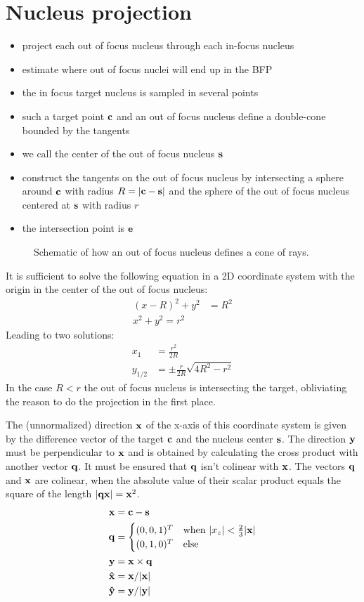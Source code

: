 \documentclass[twocolumn,DIV19]{scrartcl}
\begin{document}
\section{Nucleus projection}
\begin{itemize}
\item project each out of focus nucleus through each in-focus nucleus 
\item estimate where out of focus nuclei will end up in the BFP
\item the in focus target nucleus is sampled in several points
\item such a target point $\mathbf{c}$ and an out of focus nucleus define a
  double-cone bounded by the tangents
\item we call the center of the out of focus nucleus $\mathbf{s}$
\item construct the tangents on the out of focus nucleus by
  intersecting a sphere around $\mathbf{c}$ with radius $R=\mathopen| \mathbf{c}-\mathbf{s} \mathclose|$ and
  the sphere of the out of focus nucleus centered at $\mathbf{s}$ with radius
  $r$
\item the intersection point is $\mathbf{e}$
\end{itemize}

\begin{figure}[!hbt]
  \centering
  
  \caption{Schematic of how an out of focus nucleus defines a cone of
    rays.}
\end{figure}
It is sufficient to solve the following equation in a 2D coordinate
system with the origin in the center of the out of focus nucleus:
\begin{align}
  (x-R)^2+y^2&=R^2\\
  x^2+y^2=r^2
\end{align}
Leading to two solutions:
\begin{align}
  x_1&=\frac{r^2}{2R}\\
  y_{1/2}&=\pm\frac{r}{2R}\sqrt{4R^2-r^2}
\end{align}
In the case $R<r$ the out of focus nucleus is intersecting the target,
obliviating the reason to do the projection in the first place.

The (unnormalized) direction $\mathbf{x}$ of the x-axis of this coordinate
system is given by the difference vector of the target $\mathbf{c}$ and the
nucleus center $\mathbf{s}$. The direction $\mathbf{y}$ must be perpendicular to $\mathbf{x}$
and is obtained by calculating the cross product with another vector
$\mathbf{q}$.  It must be ensured that $\mathbf{q}$ isn't colinear with $\mathbf{x}$. The
vectors $\mathbf{q}$ and $\mathbf{x}$ are colinear, when the absolute value of their
scalar product equals the square of the length $\mathopen| \mathbf{q}\mathbf{x} \mathclose|=\mathbf{x}^2$.
\begin{align}
  \mathbf{x}&=\mathbf{c}-\mathbf{s}\\
  \mathbf{q}&=\begin{cases}
    (0,0,1)^T & \textrm{when}\ \mathopen| x_z \mathclose|<\frac{2}{3}\mathopen| \mathbf{x} \mathclose|\\
    (0,1,0)^T & \textrm{else}
  \end{cases}\\
  \mathbf{y}&=\mathbf{x}\times\mathbf{q} \\
  \mathbf{\hat{x}}&=\mathbf{x}/\mathopen| \mathbf{x} \mathclose|\\
  \mathbf{\hat{y}}&=\mathbf{y}/\mathopen| \mathbf{y} \mathclose|
\end{align}
\end{document}
